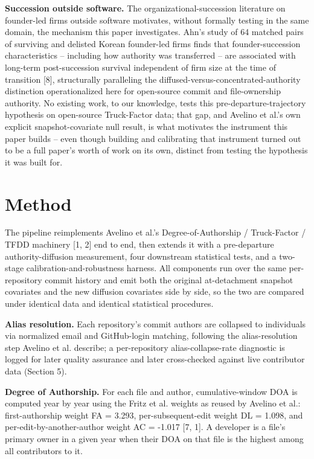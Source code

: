 \documentclass[11pt,letterpaper]{article}
\begin{document}
\textbf{Succession outside software.} The organizational-succession literature on founder-led firms outside software motivates, without formally testing in the same domain, the mechanism this paper investigates. Ahn's study of 64 matched pairs of surviving and delisted Korean founder-led firms finds that founder-succession characteristics -- including how authority was transferred -- are associated with long-term post-succession survival independent of firm size at the time of transition [8], structurally paralleling the diffused-versus-concentrated-authority distinction operationalized here for open-source commit and file-ownership authority. No existing work, to our knowledge, tests this pre-departure-trajectory hypothesis on open-source Truck-Factor data; that gap, and Avelino et al.'s own explicit snapshot-covariate null result, is what motivates the instrument this paper builds -- even though building and calibrating that instrument turned out to be a full paper's worth of work on its own, distinct from testing the hypothesis it was built for.

\section{Method}

The pipeline reimplements Avelino et al.'s Degree-of-Authorship / Truck-Factor / TFDD machinery [1, 2] end to end, then extends it with a pre-departure authority-diffusion measurement, four downstream statistical tests, and a two-stage calibration-and-robustness harness. All components run over the same per-repository commit history and emit both the original at-detachment snapshot covariates and the new diffusion covariates side by side, so the two are compared under identical data and identical statistical procedures.

\textbf{Alias resolution.} Each repository's commit authors are collapsed to individuals via normalized email and GitHub-login matching, following the alias-resolution step Avelino et al. describe; a per-repository alias-collapse-rate diagnostic is logged for later quality assurance and later cross-checked against live contributor data (Section 5).

\textbf{Degree of Authorship.} For each file and author, cumulative-window DOA is computed year by year using the Fritz et al. weights as reused by Avelino et al.: first-authorship weight FA = 3.293, per-subsequent-edit weight DL = 1.098, and per-edit-by-another-author weight AC = -1.017 [7, 1]. A developer is a file's primary owner in a given year when their DOA on that file is the highest among all contributors to it.
\end{document}
